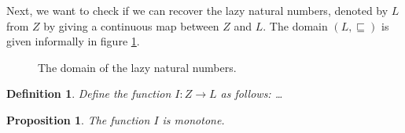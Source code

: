 \documentclass[a4paper]{article}
\newcommand{\arr}{\rightarrow}
\newtheorem{defIMapsNuFToL}[defNuF]{Definition}
\newtheorem{thmIIsMonotone}[defNuF]{Proposition}
\begin{document}
Next, we want to check if we can recover the lazy natural numbers, denoted by
$L$ from $Z$ by giving a continuous map between $Z$ and $L$.  The domain $(L,
\sqsubseteq)$ is given informally in figure \ref{figDomainOfLazyNaturals}.


\begin{figure}
\begin{center}
\end{center}
\caption{The domain of the lazy natural numbers.}
\label{figDomainOfLazyNaturals}
\end{figure}

\begin{defIMapsNuFToL}

Define the function $I : Z \arr L$ as follows: \ldots

\end{defIMapsNuFToL}


\begin{thmIIsMonotone}

The function $I$ is monotone.

\end{thmIIsMonotone}
\end{document}
